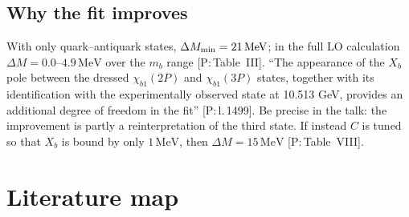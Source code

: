 \documentclass[11pt,a4paper]{article}
\newcommand{\tagP}[1]{\textcolor{blue!65!black}{\textsf{\small[P:\,#1]}}}
\renewcommand{\MeV}{\,\mathrm{MeV}}
\begin{document}
\subsection{Why the fit improves}
With only quark--antiquark states, $\Delta M_{\rm min}=21\MeV$; in the full LO calculation $\Delta M=0.0$--$4.9\MeV$ over the $m_b$ range \tagP{Table~III}. ``The appearance of the $X_b$ pole between the dressed $\chi_{b1}(2P)$ and $\chi_{b1}(3P)$ states, together with its identification with the experimentally observed state at 10.513 GeV, provides an additional degree of freedom in the fit'' \tagP{l.\,1499}. Be precise in the talk: the improvement is partly a reinterpretation of the third state. If instead $C$ is tuned so that $X_b$ is bound by only $1\MeV$, then $\Delta M=15\MeV$ \tagP{Table~VIII}.

\section{Literature map}
\label{sec:lit}
\end{document}
